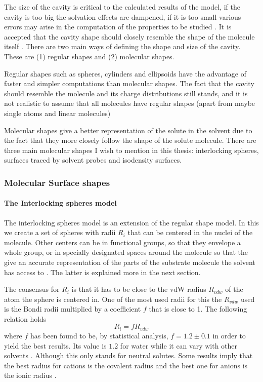 \documentclass[../master_thesis.tex]{subfiles}
\begin{document}
The size of the cavity is critical to the calculated results of the model, if
the cavity is too big the solvation effects are dampened, if it is too small
various errors may arise in the computation of the properties to be studied
\cite{Tomasi:1994wt}. It is accepted that the cavity shape should closely
resemble the shape of the molecule itself \cite{Tomasi:2005ipa}. There are two
main ways of defining the shape and size of the cavity. These are (1) regular
shapes and (2) molecular shapes.

Regular shapes such as spheres, cylinders and ellipsoids have the advantage of
faster and simpler computations than molecular shapes. The fact that the cavity
should resemble the molecule and its charge distributions still stands, and it
is not realistic to assume that all molecules have regular shapes (apart from
maybe single atoms and linear molecules) \cite{Tomasi:2005ipa}

Molecular shapes give a better representation of the solute in the solvent due
to the fact that they more closely follow the shape of the solute molecule.
There are three main molecular shapes I wish to mention in this thesis:
interlocking spheres, surfaces traced by solvent probes and isodensity surfaces.

\subsubsection{Molecular Surface shapes}

\paragraph{The Interlocking spheres model}
The interlocking spheres model is an extension of the regular shape model. In
this we create a set of spheres with radii $R_i$ that can be centered in the
nuclei of the molecule. Other centers can be in functional groups, so that they envelope a whole group,
or in specially designated spaces around the molecule so that the give an accurate
representation of the parts of the substrate molecule the solvent has access to
\cite{Tomasi:1994wt}. The latter is explained more in the next section.

The consensus for $R_i$ is that it has to be close to the \ac{vdW} radius
$R_{vdw}$ of the atom the sphere is centered in. One of the most used radii for
this  the $R_{vdw}$ used is the Bondi radii \cite{doi:10.1021/j100785a001,
Tomasi:2005ipa} multiplied by a coefficient $f$ that is close to 1. The
following relation holds
\cite{Tomasi:1994wt}
\begin{equation}
  R_i = fR_{vdw}
\end{equation}
where $f$ has been found to be, by statistical analysis, $f = 1.2 \pm 0.1$ in order to
yield the best results. Its value is $1.2$ for water while it can vary with
other solvents \cite{Tomasi:1994wt}. Although this only stands for neutral
solutes. Some results imply that the best radius for cations is the covalent
radius and the best one for anions is the ionic radius \cite{Tomasi:1994wt}.
\end{document}
